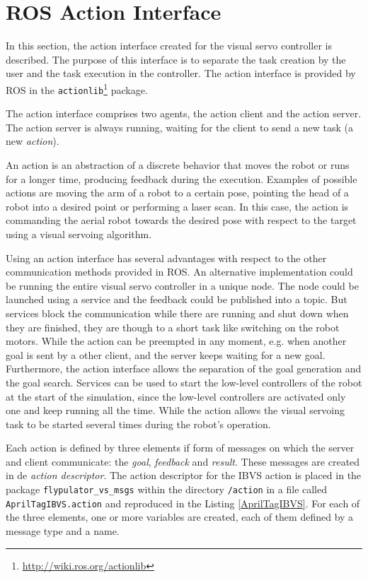 \section{ROS Action Interface}
\label{sec:ros_action}

In this section, the action interface created for the visual servo controller is described. The purpose of this interface is to separate the task creation by the user and the task execution in the controller. The action interface is provided by ROS in the \texttt{actionlib}\footnote{\url{http://wiki.ros.org/actionlib}} package.

The action interface comprises two agents, the action client and the action server. The action server is always running, waiting for the client to send a new task (a new \emph{action}).

An action \cite{ROS_ComPat} is an abstraction of a discrete behavior that moves the robot or runs for a longer time, producing feedback during the execution. Examples of possible actions are moving the arm of a robot to a certain pose, pointing the head of a robot into a desired point or performing a laser scan. In this case, the action is commanding the aerial robot towards the desired pose with respect to the target using a visual servoing algorithm.

Using an action interface has several advantages with respect to the other communication methods provided in ROS. An alternative implementation could be running the entire visual servo controller in a unique node. The node could be launched using a service and the feedback could be published into a topic. But services block the communication while there are running and shut down when they are finished, they are though to a short task like switching on the robot motors. While the action can be preempted in any moment, e.g. when another goal is sent by a other client, and the server keeps waiting for a new goal. Furthermore, the action interface allows the separation of the goal generation and the goal search. Services can be used to start the low-level controllers of the robot at the start of the simulation, since the low-level controllers are activated only one and keep running all the time. While the action allows the visual servoing task to be started several times during the robot's operation.

 Each action is defined by three elements if form of messages on which the server and client communicate: the \emph{goal}, \emph{feedback} and \emph{result}. These messages are created in de \emph{action descriptor}. The action descriptor for the IBVS action is placed in the package \texttt{flypulator\_vs\_msgs} within the directory \texttt{/action} in a file called \texttt{AprilTagIBVS.action} and reproduced in the Listing \ref{AprilTagIBVS}. For each of the three elements, one or more variables are created, each of them defined by a message type and a name.

